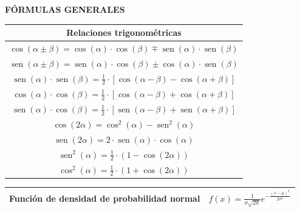 \documentclass[es]{article}
\DeclareMathOperator{\sen}{sen}
\begin{document}
\renewcommand{\arraystretch}{1}

\begin{center}

    {\bf FÓRMULAS GENERALES}

    \renewcommand{\arraystretch}{1.6}
    \begin{tabular}{|c|}
        \multicolumn{1}{c}{{\bf Relaciones trigonométricas}}\\
        \hline 
        $\cos (\alpha \pm \beta) = \cos (\alpha) \cdot \cos (\beta) \mp \sen (\alpha) \cdot \sen (\beta)$ \\
        \hline 
        $\sen (\alpha \pm \beta) = \sen (\alpha) \cdot \cos (\beta) \pm \cos(\alpha) \cdot \sen (\beta)$ \\
        \hline 
        $\sen (\alpha) \cdot \sen (\beta) = \frac{1}{2} \cdot \left [ \cos (\alpha - \beta ) - \cos (\alpha + \beta ) \right ]$ \\ 
        \hline 
        $\cos (\alpha) \cdot \cos (\beta) = \frac{1}{2} \cdot \left [ \cos (\alpha - \beta ) + \cos (\alpha + \beta ) \right ]$ \\
        \hline 
        $\sen (\alpha) \cdot \cos (\beta) = \frac{1}{2} \cdot \left [ \sen (\alpha - \beta ) + \sen (\alpha + \beta ) \right ]$ \\ 
        \hline 
        $\cos (2 \alpha) = \cos^2 (\alpha) - \sen^2 (\alpha)$ \\ 
        \hline 
        $\sen (2 \alpha) = 2 \cdot \sen (\alpha) \cdot \cos (\alpha)$ \\
        \hline 
        $\sen^2 (\alpha) = \frac{1}{2} \cdot \left ( 1 - \cos (2 \alpha) \right )$ \\
        \hline 
        $\cos^2 (\alpha) = \frac{1}{2} \cdot \left ( 1 + \cos (2 \alpha) \right )$ \\
        \hline
    \end{tabular}
    \renewcommand{\arraystretch}{1}
    \vspace{0.5cm}

    \renewcommand{\arraystretch}{2}
        \begin{tabular}{|c|c|}
            \hline 
            Función de densidad de probabilidad normal & $f(x) = \displaystyle\frac{1}{\sigma \sqrt{2 \pi}} e^{- \displaystyle\frac{(x - \mu)^2}{2 \sigma^2}}$ \\
            \hline
        \end{tabular}
    \renewcommand{\arraystretch}{1}


\end{center}
\end{document}
